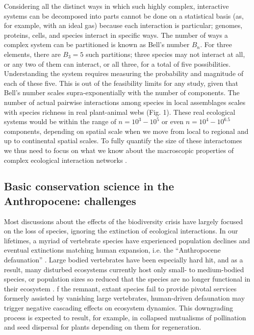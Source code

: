 \documentclass[10pt,letterpaper]{article}
\begin{document}
Considering all the distinct ways in which such highly complex, interactive systems can be decomposed into parts cannot be done on a statistical basis (as, for example, with an ideal gas) because each interaction is particular; genomes, proteins, cells, and species interact in specific ways. The number of ways a complex system can be partitioned is known as Bell’s number $B_n$\cite{Koch:2012aa}. For three elements, there are $B_3 = 5$ such partitions; three species may not interact at all, or any two of them can interact, or all three, for a total of five possibilities. Understanding the system requires measuring the probability and magnitude of each of these five. This is out of the feasibility limits for any study\cite{Koch:2012aa}, given that Bell’s number scales supra-exponentially with the number of components. The number of actual pairwise interactions among species in local assemblages scales with species richness in real plant-animal webs (Fig. 1). These real ecological systems would be within the range of $n= 10^3-10^5$ or even $n= 10^4-10^{6.5}$ components, depending on spatial scale when we move from local to regional and up to continental spatial scales. To fully quantify the size of these interactomes we thus need to focus on what we know about the macroscopic properties of complex ecological interaction networks \cite{Thompson:2009}. 

\subsection*{Basic conservation science in the Anthropocene: challenges}
Most discussions about the effects of the biodiversity crisis have largely focused on the loss of species, ignoring the extinction of ecological interactions. In our lifetimes, a myriad of vertebrate species have experienced population declines and eventual extinctions matching human expansion, i.e. the “Anthropocene defaunation” \cite{Dirzo:2014}. Large bodied vertebrates have been especially hard hit, and as a result, many disturbed ecosystems currently host only small- to medium-bodied species, or population sizes so reduced that the species are no longer functional in their ecosystem \cite{Redford:1992}. f the remnant, extant species fail to provide pivotal services formerly assisted by vanishing large vertebrates, human-driven defaunation may trigger negative cascading effects on ecosystem dynamics. This downgrading process is expected to result, for example, in collapsed mutualisms of pollination and seed dispersal for plants depending on them for regeneration.
\end{document}
